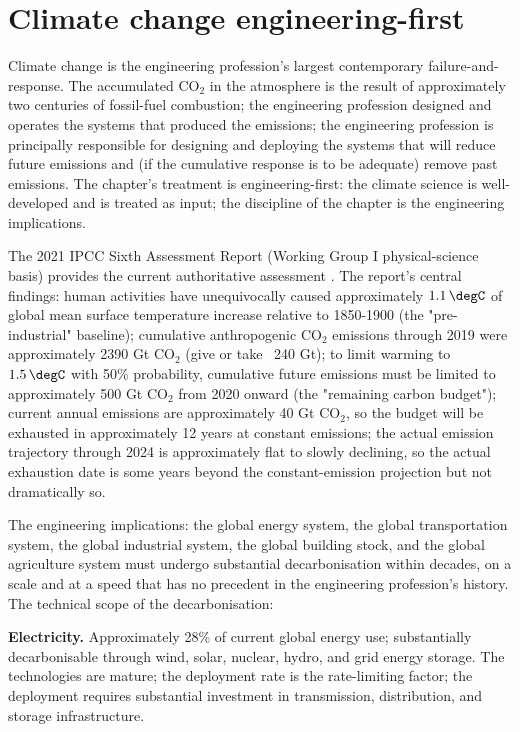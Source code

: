 \section{Climate change engineering-first}

Climate change is the engineering profession's largest contemporary failure-and-response. The accumulated CO$_2$ in the atmosphere is the result of approximately two centuries of fossil-fuel combustion; the engineering profession designed and operates the systems that produced the emissions; the engineering profession is principally responsible for designing and deploying the systems that will reduce future emissions and (if the cumulative response is to be adequate) remove past emissions. The chapter's treatment is engineering-first: the climate science is well-developed and is treated as input; the discipline of the chapter is the engineering implications.

The 2021 IPCC Sixth Assessment Report (Working Group I physical-science basis) provides the current authoritative assessment \cite{std:ipcc-ar6-wg1-2021}. The report's central findings: human activities have unequivocally caused approximately $1.1\,\degC$ of global mean surface temperature increase relative to 1850-1900 (the "pre-industrial" baseline); cumulative anthropogenic CO$_2$ emissions through 2019 were approximately 2390 Gt CO$_2$ (give or take ~240 Gt); to limit warming to $1.5\,\degC$ with 50\% probability, cumulative future emissions must be limited to approximately 500 Gt CO$_2$ from 2020 onward (the "remaining carbon budget"); current annual emissions are approximately 40 Gt CO$_2$, so the budget will be exhausted in approximately 12 years at constant emissions; the actual emission trajectory through 2024 is approximately flat to slowly declining, so the actual exhaustion date is some years beyond the constant-emission projection but not dramatically so.

The engineering implications: the global energy system, the global transportation system, the global industrial system, the global building stock, and the global agriculture system must undergo substantial decarbonisation within decades, on a scale and at a speed that has no precedent in the engineering profession's history. The technical scope of the decarbonisation:

\textbf{Electricity.} Approximately 28\% of current global energy use; substantially decarbonisable through wind, solar, nuclear, hydro, and grid energy storage. The technologies are mature; the deployment rate is the rate-limiting factor; the deployment requires substantial investment in transmission, distribution, and storage infrastructure.

